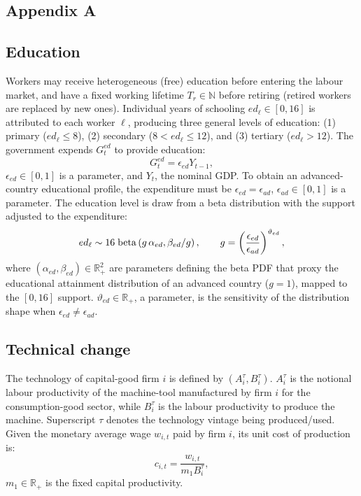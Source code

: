 \documentclass[a4paper,11pt]{article}
\begin{document}
\begin{appendices}

\section*{Appendix A}
\label{appendixA}


\subsection*{Education}

Workers may receive heterogeneous (free) education before entering the labour market, and have a fixed working lifetime $T_r \in \mathbb{N}$ before retiring (retired workers are replaced by new ones). Individual years of schooling ${ed}_\ell \in [0, 16]$ is attributed to each worker $\ell$, producing three general levels of education: (1) primary (${ed}_\ell \le 8$), (2) secondary ($8 < {ed}_\ell \le 12$), and (3) tertiary (${ed}_\ell > 12$). The government expends $G_t^{ed}$ to provide education:
\begin{equation}
	G_t^{ed} = \epsilon_{ed} Y_{t-1},
\end{equation}
$\epsilon_{ed} \in [0, 1]$ is a parameter, and $Y_t$, the nominal GDP. To obtain an advanced-country educational profile, the expenditure must be $\epsilon_{ed} = \epsilon_{ad}$, $\epsilon_{ad} \in [0, 1]$ is a parameter. The education level is draw from a beta distribution with the support adjusted to the expenditure:
\begin{equation}
	{ed}_\ell \sim 16 \thickspace \mathrm{beta} \left( g \, \alpha_{ed}, \beta_{ed} / g \right), \qquad
	g = \left( \frac{ \epsilon_{ed} }{ \epsilon_{ad} } \right)^{\vartheta_{ed}},
	\label{educDist}
\end{equation}
where $(\alpha_{ed}, \beta_{ed}) \in \mathbb{R}_+^2$ are parameters defining the beta PDF that proxy the educational attainment distribution of an advanced country ($g = 1$), mapped to the $[0, 16]$ support. $\vartheta_{ed} \in \mathbb{R}_+$, a parameter, is the sensitivity of the distribution shape when $\epsilon_{ed} \ne \epsilon_{ad}$.


\subsection*{Technical change}

The technology of capital-good firm $i$ is defined by $(A_i^{\tau},B_i^{\tau})$. $A_i^{\tau}$ is the notional labour productivity of the machine-tool manufactured by firm $i$ for the consumption-good sector, while $B_i^{\tau}$ is the labour productivity to produce the machine. Superscript $\tau$ denotes the technology vintage being produced/used. Given the monetary average wage $w_{i,t}$ paid by firm $i$, its unit cost of production is:
\begin{equation}
	c_{i,t}  =\frac{ w_{i,t} }{ m_1 B_i^{\tau} },
\end{equation}
$m_1 \in \mathbb{R}_+$ is the fixed capital productivity.


\end{appendices}
\end{document}
